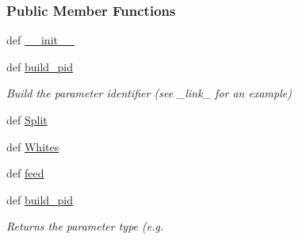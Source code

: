 \subsubsection*{\-Public \-Member \-Functions}
\begin{DoxyCompactItemize}
\item 
def \hyperlink{classforcebalance_1_1openmmio_1_1OpenMM__Reader_a111f672a2f7b835da774dc5e6f265731}{\-\_\-\-\_\-init\-\_\-\-\_\-}
\item 
def \hyperlink{classforcebalance_1_1openmmio_1_1OpenMM__Reader_ac89322d09d53425b5151f39306f4b38b}{build\-\_\-pid}
\begin{DoxyCompactList}\small\item\em \-Build the parameter identifier (see \-\_\-link\-\_\- for an example) \end{DoxyCompactList}\item 
def \hyperlink{classforcebalance_1_1BaseReader_acded199bbc003eb93d071a972ef38901}{\-Split}
\item 
def \hyperlink{classforcebalance_1_1BaseReader_af2af8a559625614474a1c6fe245b5e13}{\-Whites}
\item 
def \hyperlink{classforcebalance_1_1BaseReader_a3c46942ef8cc25ece21d52be5b7ba05f}{feed}
\item 
def \hyperlink{classforcebalance_1_1BaseReader_aab2c64ccf0f803d4eff3bbf40a6cb0b7}{build\-\_\-pid}
\begin{DoxyCompactList}\small\item\em \-Returns the parameter type (e.\-g. \end{DoxyCompactList}\end{DoxyCompactItemize}
